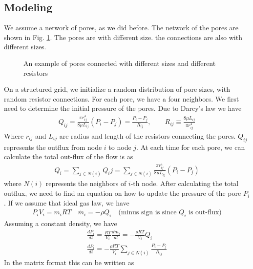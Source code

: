 \subsection{Modeling}
%
We assume a network of pores, as we did before. The network of the pores are shown in Fig. \ref{fig:relaxation-network}. The pores are with different size. the connections are also with different sizes. 
%
\begin{figure}[H]
  \centering
  \caption{An example of pores connected with different sizes and different resistors} \label{fig:relaxation-network}
\end{figure}
%
On a structured grid, we initialize a random distribution of pore sizes, with random resistor connections. For each pore, we have a four neighbors. We first  need to determine the initial pressure of the pores.  Due to Darcy's law we have
%
\begin{align}
    Q_{ij} = \frac{\pi r_{ij}^4}{8 \mu L_{ij}} \left( {P_i - P_j}\right) = \frac{P_i - P_j}{R_{ij}}, \qquad R_{ij} \equiv \frac{8 \mu L_{ij}}{\pi r_{ij}^4}
\end{align}
%
Where $r_{ij}$ and $L_{ij}$ are radius and length of the resistors connecting the pores. $Q_{ij}$ represents the outflux from node $i$ to node $j$. At each time for each pore, we can calculate the total out-flux of the flow is as 
%
\begin{align}
    Q_i = \sum_{j \in N(i)} Q_ij = \sum_{j \in N(i)} \frac{\pi r_{ij}^4}{8 \mu L_{ij}} \left( {P_i - P_j}\right)
\end{align}
%
where $N(i)$ represents the neighbors of $i$-th node. After calculating the total outflux, we need to find an equation on how to update the pressure of the pore $P_i$. If we assume that ideal gas law, we have
%
\begin{align}
    P_i V_i = m_i RT \quad \dot{m_i} = - \rho Q_i \quad \text{(minus sign is since } Q_i \text{ is out-flux)} 
    \end{align}
%
Assuming a constant density, we have
%
\begin{align}
    \frac{d P_i}{dt} = \frac{RT}{V_i} \frac{d m_i}{dt}  = -\frac{\rho RT}{V_i} Q_i \\
    \frac{d P_i}{dt} = - \frac{\rho RT}{V_i} \sum_{j \in N(i)} \frac{P_i - P_j}{R_{ij}}  
\end{align}
%
In the matrix format this can be written as 
